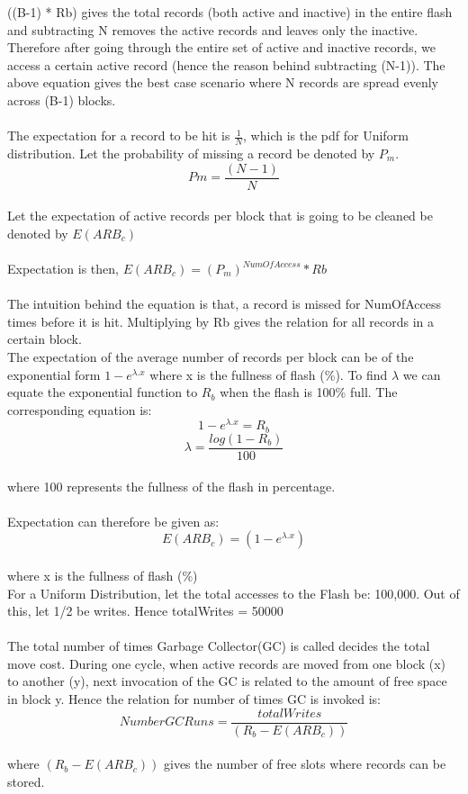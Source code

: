 \documentclass[11pt]{report} %
\begin{document}
((B-1) * Rb) gives the total records (both active and inactive) in the entire flash and subtracting N removes the active records and leaves only the inactive. Therefore after going through the entire set of active and inactive records, we access a certain active record (hence the reason behind subtracting (N-1)). The above equation gives the best case scenario where N records are spread evenly across (B-1) blocks.\\
\\

The expectation for a record to be hit is $\frac{1}{N}$, which is the pdf for Uniform distribution. Let the probability of missing a record be denoted by $P_m$. 
\begin{equation}Pm = \frac{(N-1)}{N}\end{equation}\\
Let the expectation of active records per block that is going to be cleaned be denoted by $E(ARB_c)$\\
\\

Expectation is then, $E(ARB_c) = (P_m)^{NumOfAccess} * Rb$\\
\\
The intuition behind the equation is that, a record is missed for NumOfAccess times before it is hit. Multiplying by Rb gives the relation for all records in a certain block.\\


The expectation of the average number of records per block can be of the exponential form $1-e^{\lambda . x}$ where x is the fullness of flash (\%). To find $\lambda$ we can equate the exponential function to $R_b$ when the flash is 100\% full. 
The corresponding equation is:
$$1-e^{\lambda . x} = R_b$$
$$\lambda = \frac{log(1 - R_b)}{100}$$\\
where 100 represents the fullness of the flash in percentage.\\
\\
Expectation can therefore be given as: $$E(ARB_c) = (1 - e^{\lambda . x})$$\\
where x is the fullness of flash (\%)
\\

For a Uniform Distribution, let the total accesses to the Flash be: 100,000. Out of this, let 1/2 be writes. Hence totalWrites = 50000\\
\\

The total number of times  Garbage Collector(GC) is called decides the total move cost. During one cycle, when active records are moved from one block (x) to another (y), next invocation of the GC is related to the amount of free space in block y. Hence the relation for number of times GC is invoked is:\\
\begin{equation}NumberGCRuns = \frac{totalWrites}{(R_b - E(ARB_c))}\end{equation}\\
where ${(R_b - E(ARB_c))}$ gives the number of free slots where records can be stored.\\
\\
\end{document}
